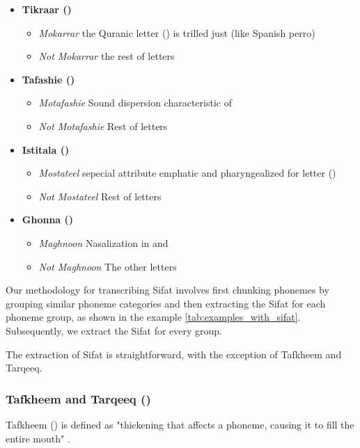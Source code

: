 \begin{itemize}
\item \textbf{Tikraar ()}
\begin{itemize}
  \item \textit{Mokarrar} the Quranic letter () is trilled just (like Spanish perro)
  \item \textit{Not Mokarrar} the rest of letters
\end{itemize}

\item \textbf{Tafashie ()}
\begin{itemize}
  \item \textit{Motafashie} Sound dispersion characteristic of 
  \item \textit{Not Motafashie} Rest of letters
\end{itemize}

\item \textbf{Istitala ()}
\begin{itemize}
  \item \textit{Mostateel} sepecial attribute emphatic and pharyngealized for letter ()
  \item \textit{Not Mostateel} Rest of letters
\end{itemize}

\item \textbf{Ghonna ()}
\begin{itemize}
  \item \textit{Maghnoon} Nasalization in  and 
  \item \textit{Not Maghnoon} The other letters
\end{itemize}
\end{itemize}

Our methodology for transcribing Sifat involves first chunking phonemes by grouping similar phoneme categories and then extracting the Sifat for each phoneme group, as shown in the example \ref{tab:examples_with_sifat}. Subsequently, we extract the Sifat for every group.

The extraction of Sifat is straightforward, with the exception of Tafkheem and Tarqeeq.

\subsubsection{Tafkheem and Tarqeeq ()}

Tafkheem () is defined as "thickening that affects a phoneme, causing it to fill the entire mouth" \cite{sweed2021}.

